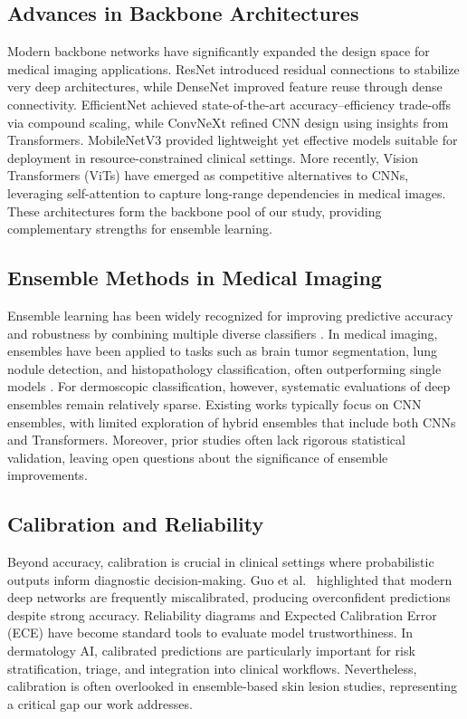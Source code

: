 \documentclass[preprint,12pt]{elsarticle}
\begin{document}
\subsection{Advances in Backbone Architectures}
Modern backbone networks have significantly expanded the design space for medical imaging applications. ResNet \citet{he2016resnet} introduced residual connections to stabilize very deep architectures, while DenseNet \citet{huang2017densenet} improved feature reuse through dense connectivity. EfficientNet \citet{tan2019efficientnet} achieved state-of-the-art accuracy–efficiency trade-offs via compound scaling, while ConvNeXt \citet{liu2022convnext} refined CNN design using insights from Transformers.
MobileNetV3 \citet{howard2019mobilenetv3} provided lightweight yet effective models suitable for deployment in resource-constrained clinical settings. More recently, Vision Transformers (ViTs) \citep{dosovitskiy2021vit} have emerged as competitive alternatives to CNNs, leveraging self-attention to capture long-range dependencies in medical images. These architectures form the backbone pool of our study, providing complementary strengths for ensemble learning.

\subsection{Ensemble Methods in Medical Imaging}
Ensemble learning has been widely recognized for improving predictive accuracy and robustness by combining multiple diverse classifiers \citep{dietterich2000ensemble}. In medical imaging, ensembles have been applied to tasks such as brain tumor segmentation, lung nodule detection, and histopathology classification, often outperforming single models \citep{valverde2021ensembles}. For dermoscopic classification, however, systematic evaluations of deep ensembles remain relatively sparse. Existing works typically focus on CNN ensembles, with limited exploration of hybrid ensembles that include both CNNs and Transformers. Moreover, prior studies often lack rigorous statistical validation, leaving open questions about the significance of ensemble improvements.

\subsection{Calibration and Reliability}
Beyond accuracy, calibration is crucial in clinical settings where probabilistic outputs inform diagnostic decision-making. Guo et al.\ \citet{guo2017calibration} highlighted that modern deep networks are frequently miscalibrated, producing overconfident predictions despite strong accuracy. Reliability diagrams and Expected Calibration Error (ECE) have become standard tools to evaluate model trustworthiness. In dermatology AI, calibrated predictions are particularly important for risk stratification, triage, and integration into clinical workflows. Nevertheless, calibration is often overlooked in ensemble-based skin lesion studies, representing a critical gap our work addresses.
\end{document}
